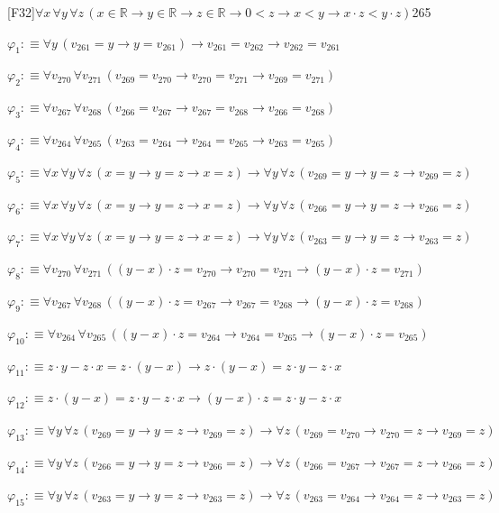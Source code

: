 \begin{fullproof}{[F32]}{$\forall x\,\forall y\,\forall z\,(x \in \mathbb{R} \to y \in \mathbb{R} \to z \in \mathbb{R} \to 0 < z \to x < y \to x \cdot z < y \cdot z)$}{265}
\begin{ptree}
\end{ptree}
\begin{abbrevlist}
\item $\varphi_{1} :\equiv \forall y\,(v_{261} = y \to y = v_{261}) \to v_{261} = v_{262} \to v_{262} = v_{261}$
\item $\varphi_{2} :\equiv \forall v_{270}\,\forall v_{271}\,(v_{269} = v_{270} \to v_{270} = v_{271} \to v_{269} = v_{271})$
\item $\varphi_{3} :\equiv \forall v_{267}\,\forall v_{268}\,(v_{266} = v_{267} \to v_{267} = v_{268} \to v_{266} = v_{268})$
\item $\varphi_{4} :\equiv \forall v_{264}\,\forall v_{265}\,(v_{263} = v_{264} \to v_{264} = v_{265} \to v_{263} = v_{265})$
\item $\varphi_{5} :\equiv \forall x\,\forall y\,\forall z\,(x = y \to y = z \to x = z) \to \forall y\,\forall z\,(v_{269} = y \to y = z \to v_{269} = z)$
\item $\varphi_{6} :\equiv \forall x\,\forall y\,\forall z\,(x = y \to y = z \to x = z) \to \forall y\,\forall z\,(v_{266} = y \to y = z \to v_{266} = z)$
\item $\varphi_{7} :\equiv \forall x\,\forall y\,\forall z\,(x = y \to y = z \to x = z) \to \forall y\,\forall z\,(v_{263} = y \to y = z \to v_{263} = z)$
\item $\varphi_{8} :\equiv \forall v_{270}\,\forall v_{271}\,((y - x) \cdot z = v_{270} \to v_{270} = v_{271} \to (y - x) \cdot z = v_{271})$
\item $\varphi_{9} :\equiv \forall v_{267}\,\forall v_{268}\,((y - x) \cdot z = v_{267} \to v_{267} = v_{268} \to (y - x) \cdot z = v_{268})$
\item $\varphi_{10} :\equiv \forall v_{264}\,\forall v_{265}\,((y - x) \cdot z = v_{264} \to v_{264} = v_{265} \to (y - x) \cdot z = v_{265})$
\item $\varphi_{11} :\equiv z \cdot y - z \cdot x = z \cdot (y - x) \to z \cdot (y - x) = z \cdot y - z \cdot x$
\item $\varphi_{12} :\equiv z \cdot (y - x) = z \cdot y - z \cdot x \to (y - x) \cdot z = z \cdot y - z \cdot x$
\item $\varphi_{13} :\equiv \forall y\,\forall z\,(v_{269} = y \to y = z \to v_{269} = z) \to \forall z\,(v_{269} = v_{270} \to v_{270} = z \to v_{269} = z)$
\item $\varphi_{14} :\equiv \forall y\,\forall z\,(v_{266} = y \to y = z \to v_{266} = z) \to \forall z\,(v_{266} = v_{267} \to v_{267} = z \to v_{266} = z)$
\item $\varphi_{15} :\equiv \forall y\,\forall z\,(v_{263} = y \to y = z \to v_{263} = z) \to \forall z\,(v_{263} = v_{264} \to v_{264} = z \to v_{263} = z)$

\end{abbrevlist}
\end{fullproof}
